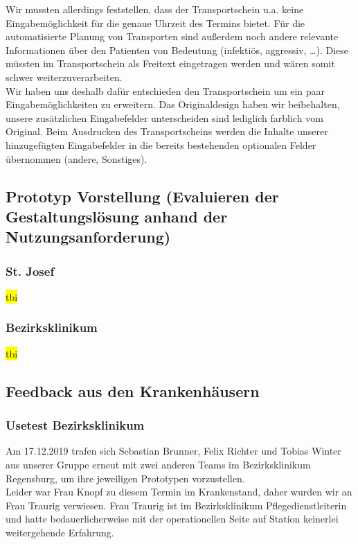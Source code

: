 \documentclass[a4paper, ngerman, 12pt]{scrartcl}
\begin{document}
Wir mussten allerdings feststellen, dass der Transportschein u.a. keine Eingabemöglichkeit für die genaue Uhrzeit des Termins bietet. Für die automatisierte Planung von Transporten sind außerdem noch andere relevante Informationen über den Patienten von Bedeutung (infektiös, aggressiv, …). Diese müssten im Transportschein als Freitext eingetragen werden und wären somit schwer weiterzuverarbeiten.\\

Wir haben uns deshalb dafür entschieden den Transportschein um ein paar Eingabemöglichkeiten zu erweitern. Das Originaldesign haben wir beibehalten, unsere zusätzlichen Eingabefelder unterscheiden sind lediglich farblich vom Original. Beim Ausdrucken des Transportscheins werden die Inhalte unserer hinzugefügten Eingabefelder in die bereits bestehenden optionalen Felder übernommen (andere, Sonstiges).
\subsection{Prototyp Vorstellung (Evaluieren der Gestaltungslösung anhand der Nutzungsanforderung) }
\subsubsection{St. Josef}
\colorbox{yellow}{tbi}\\
\subsubsection{Bezirksklinikum}
\colorbox{yellow}{tbi}\\
\subsection{Feedback aus den Krankenhäusern}
\subsubsection{Usetest Bezirksklinikum}
Am 17.12.2019 trafen sich Sebastian Brunner, Felix Richter und Tobias Winter aus unserer Gruppe erneut mit zwei anderen Teams im Bezirksklinikum Regensburg, um ihre jeweiligen Prototypen vorzustellen.\\

Leider war Frau Knopf zu diesem Termin im Krankenstand, daher wurden wir an Frau Traurig verwiesen. Frau Traurig ist im Bezirksklinikum Pflegedienstleiterin und hatte bedauerlicherweise mit der operationellen Seite auf Station keinerlei weitergehende Erfahrung.\\
 
\end{document}
